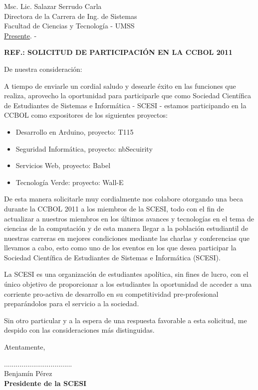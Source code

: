 \documentclass[letterpaper,12pt]{letter}
\begin{document}
\date{18 de octubre de 2011}
\begin{letter}{Msc. Lic. Salazar Serrudo Carla \\ Directora de la Carrera de Ing. de Sistemas \\ Facultad de Ciencias y Tecnolog\'ia - UMSS \\ \underline {Presente}. -}

\begin{center}
	\opening{\textbf{REF.: SOLICITUD DE PARTICIPACI\'ON EN LA CCBOL 2011}}
\end{center}

De nuestra consideración:

A tiempo de enviarle un cordial saludo y desearle éxito en las funciones que realiza, aprovecho la 
oportunidad para participarle que como Sociedad Cient\'ifica de Estudiantes de Sistemas e Inform\'atica - 
SCESI - estamos participando en la CCBOL como expositores de los siguientes proyectos:

\begin{itemize}
    \item Desarrollo en Arduino, proyecto: T115
    \item Seguridad Informática, proyecto: nbSecuirity
    \item Servicios Web, proyecto: Babel
    \item Tecnología Verde: proyecto: Wall-E
\end{itemize}

De esta manera solicitarle muy cordialmente nos colabore otorgando una beca durante la CCBOL 2011 a los 
miembros de la SCESI, todo con el fin de actualizar a nuestros miembros en los últimos avances y tecnologías 
en el tema de ciencias de la computación y de esta manera llegar a la población estudiantil de nuestras 
carreras en mejores condiciones mediante las charlas y conferencias que llevamos a cabo, esto como uno de los 
eventos en los que desea participar la Sociedad Científica de Estudiantes de Sistemas e Informática (SCESI).

La SCESI es una organización de estudiantes apolítica, sin fines de lucro, con el único objetivo de 
proporcionar a los estudiantes la oportunidad de acceder a una corriente pro-activa de desarrollo en su 
competitividad pre-profesional preparándolos para el servicio a la sociedad.

Sin otro particular y a la espera de una respuesta favorable a esta solicitud, me despido con las 
consideraciones más distinguidas.

Atentamente,

\vspace{1cm}

\begin{center}
...................................\\
Benjam\'in P\'erez\\
{\bfseries Presidente de la  SCESI}
\end{center}
\end{letter}
\end{document}
